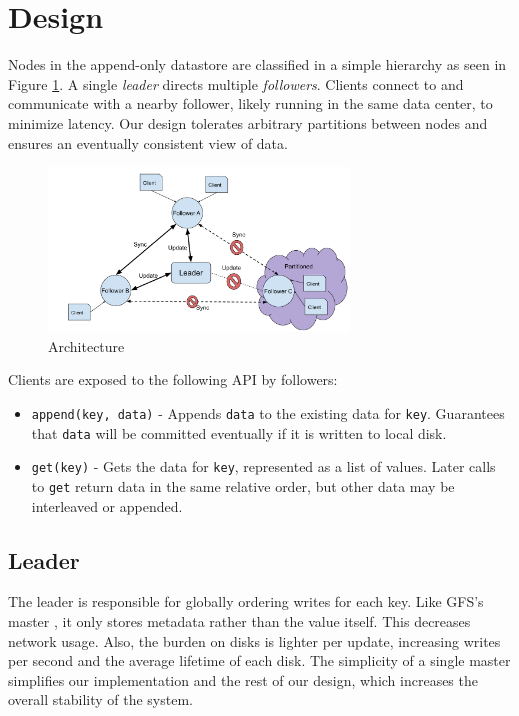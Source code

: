 \documentclass[11pt,english,twocolumn]{article}
\begin{document}
\section{Design}
Nodes in the append-only datastore are classified in a simple hierarchy as seen
in Figure \ref{Architecture}. A single \textit{leader} directs multiple
\textit{followers}. Clients connect to and communicate with a nearby follower,
likely running in the same data center, to minimize latency. Our design tolerates
arbitrary partitions between nodes and ensures an eventually consistent view of
data.
\begin{figure}[t]
\includegraphics[width=8cm]{figure/SystemStructure.pdf}
\caption{Architecture}
\label{Architecture}
\end{figure}
Clients are exposed to the following API by followers:
\begin{itemize}
	\item \texttt{append(key, data)} - Appends \texttt{data} to the existing
		data for \texttt{key}. Guarantees that \texttt{data} will be
		committed eventually if it is written to local disk.
	\item \texttt{get(key)} - Gets the data for \texttt{key}, represented as a
		list of values. Later calls to \texttt{get} return data in the
		same relative order, but other data may be interleaved or
		appended.
\end{itemize}

\subsection{Leader}
The leader is responsible for globally ordering writes for each key. Like GFS's
master \cite{GFS}, it only stores metadata rather than the value itself.
This decreases network usage.  Also, the
burden on disks is lighter per update, increasing writes per second and the
average lifetime of each disk. The simplicity of a single master
simplifies our implementation and the rest of our design, which increases
the overall stability of the system. 
\end{document}
